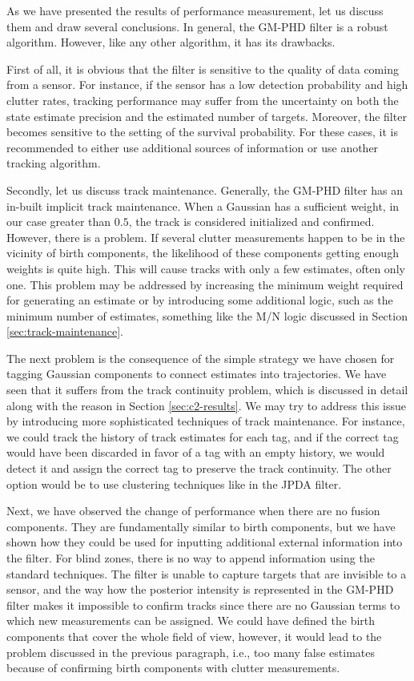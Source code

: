 As we have presented the results of performance measurement, let us discuss them and draw several conclusions. In general, the GM-PHD filter is a robust algorithm. However, like any other algorithm, it has its drawbacks.

First of all, it is obvious that the filter is sensitive to the quality of data coming from a sensor. For instance, if the sensor has a low detection probability and high clutter rates, tracking performance may suffer from the uncertainty on both the state estimate precision and the estimated number of targets. Moreover, the filter becomes sensitive to the setting of the survival probability. For these cases, it is recommended to either use additional sources of information or use another tracking algorithm.

Secondly, let us discuss track maintenance. Generally, the GM-PHD filter has an in-built implicit track maintenance. When a Gaussian has a sufficient weight, in our case greater than $0.5$, the track is considered initialized and confirmed. However, there is a problem. If several clutter measurements happen to be in the vicinity of birth components, the likelihood of these components getting enough weights is quite high. This will cause tracks with only a few estimates, often only one. This problem may be addressed by increasing the minimum weight required for generating an estimate or by introducing some additional logic, such as the minimum number of estimates, something like the M/N logic discussed in Section \ref{sec:track-maintenance}.

The next problem is the consequence of the simple strategy we have chosen for tagging Gaussian components to connect estimates into trajectories. We have seen that it suffers from the track continuity problem, which is discussed in detail along with the reason in Section \ref{sec:c2-results}. We may try to address this issue by introducing more sophisticated techniques of track maintenance. For instance, we could track the history of track estimates for each tag, and if the correct tag would have been discarded in favor of a tag with an empty history, we would detect it and assign the correct tag to preserve the track continuity. The other option would be to use clustering techniques like in the JPDA filter.

Next, we have observed the change of performance when there are no fusion components. They are fundamentally similar to birth components, but we have shown how they could be used for inputting additional external information into the filter. For blind zones, there is no way to append information using the standard techniques. The filter is unable to capture targets that are invisible to a sensor, and the way how the posterior intensity is represented in the GM-PHD filter makes it impossible to confirm tracks since there are no Gaussian terms to which new measurements can be assigned. We could have defined the birth components that cover the whole field of view, however, it would lead to the problem discussed in the previous paragraph, i.e., too many false estimates because of confirming birth components with clutter measurements.

